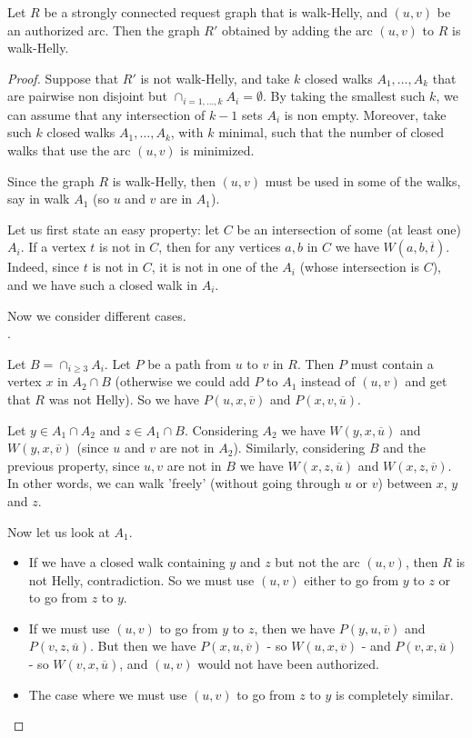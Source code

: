 \documentclass[11pt]{article}%
\begin{document}
\begin{lemma}
\label{lemma:authorized}
Let $R$ be a strongly connected request graph that is walk-Helly, and $(u,v)$ be an authorized arc. Then the graph $R'$ obtained by adding the arc $(u,v)$ to $R$ is walk-Helly.  
\end{lemma}
 
\begin{proof}
Suppose that $R'$ is not walk-Helly, and take $k$ closed walks $A_1,\dots,A_k$ that are pairwise non disjoint but $\cap_{i=1,\dots,k} A_i=\emptyset$. By taking the smallest such $k$, we can assume that any intersection of $k-1$ sets $A_i$ is non empty. Moreover, take such $k$ closed walks $A_1,\dots,A_k$, with $k$ minimal, such that the number of closed walks that use the arc $(u,v)$ is minimized. 

Since the graph $R$ is walk-Helly, then $(u,v)$ must be used in some of the walks, say in walk $A_1$ (so $u$ and $v$ are in $A_1$).

Let us first state an easy property: let $C$ be an intersection of some (at least one) $A_i$. If a vertex $t$ is not in $C$, then for any vertices $a,b$ in $C$ we have $W(a,b,\overline{t})$. Indeed, since $t$ is not in $C$, it is not in one of the $A_i$ (whose intersection is $C$), and we have such a closed walk in $A_i$.

Now we consider different cases.\\

.

Let $B=\cap_{i\geq 3} A_i$. Let $P$ be a path from $u$ to $v$ in $R$. Then $P$ must contain a vertex $x$ in $A_2\cap B$ (otherwise we could add $P$ to $A_1$ instead of $(u,v)$ and get that $R$ was not Helly). So we have $P(u,x,\overline{v})$ and $P(x,v,\overline{u})$.

Let $y \in A_1\cap A_2$ and $z\in A_1\cap B$. Considering $A_2$ we have $W(y,x,\overline{u})$ and $W(y,x,\overline{v})$ (since $u$ and $v$ are not in $A_2$). Similarly, considering $B$ and the previous property, since $u,v$ are not in $B$ we have $W(x,z,\overline{u})$ and $W(x,z,\overline{v})$. In other words, we can walk 'freely' (without going through $u$ or $v$) between $x$, $y$ and $z$.
 
Now let us look at $A_1$. 
\begin{itemize}
	\item If we have a closed walk containing $y$ and $z$ but not the arc $(u,v)$, then $R$ is not Helly, contradiction. So we must use $(u,v)$ either to go from $y$ to $z$ or to go from $z$ to $y$.
	\item If we must use $(u,v)$ to go from $y$ to $z$, then we have $P(y,u,\overline{v})$ and $P(v,z,\overline{u})$. But then 
we have $P(x,u,\overline{v})$ - so $W(u,x,\overline{v})$ -  and $P(v,x,\overline{u})$ - so $W(v,x,\overline{u})$, and $(u,v)$ would not have been authorized.
	\item  The case where we must use $(u,v)$ to go from $z$ to $y$ is completely similar.\\
\end{itemize}
 

\end{proof}
\end{document}
